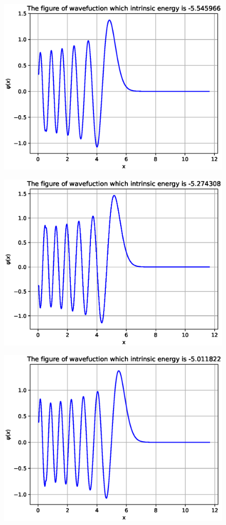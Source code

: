 \documentclass[twoside,twocolumn]{article}
\begin{document}
\begin{CJK*}{UTF8}{gkai}
\begin{figure}
	\label{fig:10}
\end{figure}
\begin{figure}
	\centering
	\includegraphics[width=0.9\linewidth]{figure/11}
	\label{fig:11}
\end{figure}
\begin{figure}
	\centering
	\includegraphics[width=0.9\linewidth]{figure/12}
	\label{fig:12}
\end{figure}
\begin{figure}
	\centering
	\includegraphics[width=0.9\linewidth]{figure/13}

\end{figure}
\end{CJK*}
\end{document}
